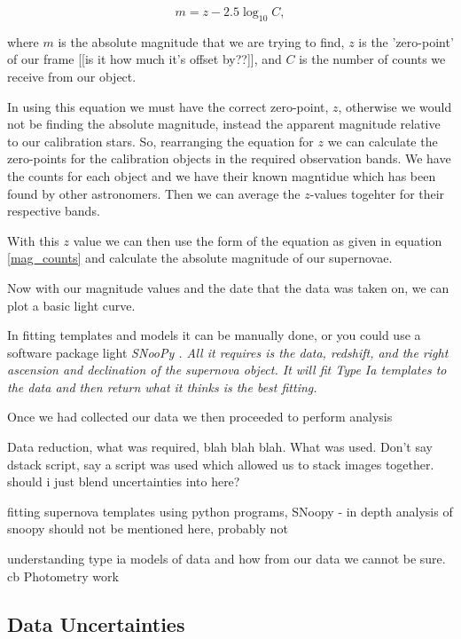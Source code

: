 \documentclass[twocolumn]{revtex4}
\begin{document}
\begin{equation}
    m = z - 2.5 \log_{10}{C},
\label{mag_counts}
\end{equation}

where $m$ is the absolute magnitude that we are trying to find, $z$ is the 'zero-point' of our frame [[is it how much it's offset by??]], and $C$ is the number of counts we receive from our object.

In using this equation we must have the correct zero-point, $z$, otherwise we would not be finding the absolute magnitude, instead the apparent magnitude relative to our calibration stars. So, rearranging the equation for $z$ we can calculate the zero-points for the calibration objects in the required observation bands. We have the counts for each object and we have their known magntidue which has been found by other astronomers. Then we can average the $z$-values togehter for their respective bands. 

With this $z$ value we can then use the form of the equation as given in equation \ref{mag_counts} and calculate the absolute magnitude of our supernovae.

Now with our magnitude values and the date that the data was taken on, we can plot a basic light curve. 

In fitting templates and models it can be manually done, or you could use a software package light \em{SNooPy }\em. All it requires is the data, redshift, and the right ascension and declination of the supernova object. It will fit Type Ia templates to the data and then return what it thinks is the best fitting.

Once we had collected our data we then proceeded to perform analysis

Data reduction, what was required, blah blah blah. What was used. Don't say dstack script, say a script was used which allowed us to stack images together. should i just blend uncertainties into here? 

fitting supernova templates using python programs, SNoopy - in depth analysis of snoopy should not be mentioned here, probably not

understanding type ia models of data and how from our data we cannot be sure.  
 cb
Photometry work 

\vspace{-3ex}
\subsection{Data Uncertainties}
\vspace{-2ex}
\end{document}

